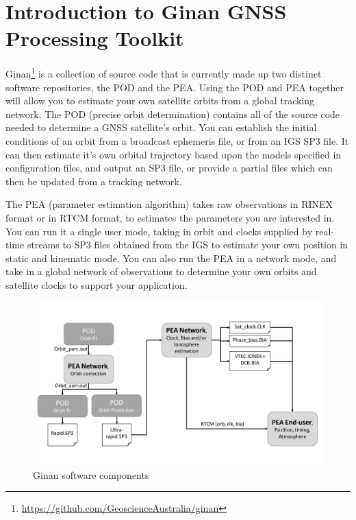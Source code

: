 \chapter{Introduction to Ginan GNSS Processing Toolkit}
\label{ch:introduction}

Ginan\footnote{\url{https://github.com/GeoscienceAustralia/ginan}} is a collection of source code that is currently made up two distinct software repositories, the POD and the PEA.
Using the POD and PEA together will allow you to estimate your own satellite orbits from a global tracking network.
The POD (precise orbit determination) contains all of the source code needed to determine a GNSS satellite's orbit. You can establish the initial conditions of an orbit from a broadcast ephemeris file, or from an IGS SP3 file. It can then estimate it's own orbital trajectory based upon the models specified in configuration files, and output an SP3 file, or provide a partial files which can then be updated from a tracking network. 


The PEA (parameter estimation algorithm) takes raw observations in RINEX format or in RTCM format, to estimates the parameters you are interested in. You can run it a single user mode, taking in orbit and clocks supplied by real-time streams to SP3 files obtained from the IGS to estimate your own position in static and kinematic mode. 
You can also run the PEA in a network mode, and take in a global network of observations to determine your own orbits and satellite clocks to support your application.

\begin{figure}
	\centering
	\includegraphics[width=\linewidth]{Figures/Ginan_diagram.pdf}
	\caption{Ginan software components}
	\label{fig:PEAnPOD}
\end{figure}

